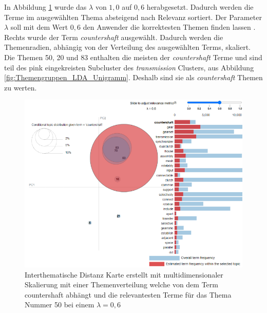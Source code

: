  
 
In Abbildung \ref{fig:clustering_process02} wurde das $\lambda$ von $1,0$ auf $0,6$ herabgesetzt. Dadurch werden die Terme im ausgewählten Thema absteigend nach Relevanz sortiert. Der Parameter $\lambda$ soll mit dem Wert $0,6$ den Anwender die korrektesten  Themen finden lassen \parencite[vgl.][S. 66-68]{sievert2014ldavis}. Rechts wurde der Term \emph{countershaft} ausgewählt. Dadurch werden die Themenradien, abhängig von der Verteilung des ausgewählten Terms, skaliert. Die Themen 50, 20 und 83 enthalten die meisten der \emph{countershaft} Terme und sind teil des pink eingekreisten Subcluster des \emph{transmission} Clusters, aus Abbildung \ref{fig:Themengruppen_LDA_Unigramm}. Deshalb sind sie als \emph{countershaft} Themen zu werten.

\begin{landscape}
	\begin{figure}[htpb]
		\centering
		\includegraphics[width=19.29cm,keepaspectratio=true]{img/clustering_process02.png}
		\caption{
			Interthematische Distanz Karte erstellt mit multidimensionaler Skalierung mit einer Themenverteilung welche von dem Term countershaft abhängt und die relevantesten Terme für das Thema Nummer 50 bei einem $\lambda = 0,6$ 
		}
		\label{fig:clustering_process02}
	\end{figure}
\end{landscape}

